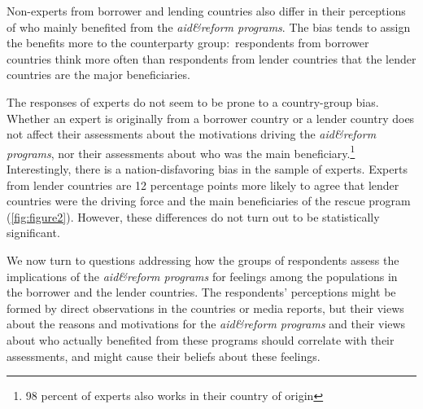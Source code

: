Non-experts from borrower and lending countries also differ in
their perceptions of who mainly benefited from the \textit{aid\&reform programs}. The
bias tends to assign the benefits more to the counterparty group:\
respondents from borrower countries think more often than respondents from
lender countries that the lender countries are the major beneficiaries. 

The responses of experts do not seem to be prone to a country-group
bias. Whether an expert is originally from a borrower country or a lender
country does not affect their assessments about the
motivations driving the \textit{aid\&reform programs}, nor their assessments about
who was the main beneficiary.\footnote{98 percent of experts also works in their country of origin }  Interestingly, there is a nation-disfavoring bias in the sample of experts. Experts from lender countries are 12 percentage points more likely to agree that lender countries were the driving force and the main beneficiaries of the rescue program (\autoref{fig:figure2}). However, these differences do not turn out to be statistically significant.

We now turn to questions addressing how the groups of respondents
assess the implications of the \textit{aid\&reform programs} for feelings among the
populations in the borrower and the lender
countries. The respondents' perceptions might be formed by direct
observations in the countries or media reports, but their views about the
reasons and motivations for the \textit{aid\&reform programs} and their views about
who actually benefited from these programs should correlate with their
assessments, and might cause their beliefs about these feelings. 

